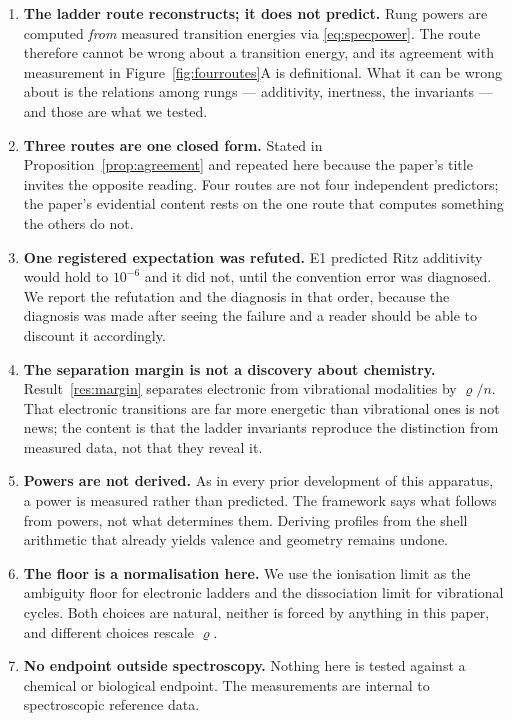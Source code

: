 \documentclass[11pt,a4paper]{article}
\theoremstyle{stmtstyle}
\theoremstyle{definition}
\theoremstyle{remark}
\newcommand{\circu}{\varrho}
\begin{document}
\begin{enumerate}[label=\textbf{L\arabic*.},leftmargin=2.9em,itemsep=4pt]

\item \textbf{The ladder route reconstructs; it does not predict.} Rung
powers are computed \emph{from} measured transition energies via
\eqref{eq:specpower}. The route therefore cannot be wrong about a
transition energy, and its agreement with measurement in
Figure~\ref{fig:fourroutes}A is definitional. What it can be wrong about is
the relations among rungs --- additivity, inertness, the invariants --- and
those are what we tested.

\item \textbf{Three routes are one closed form.} Stated in
Proposition~\ref{prop:agreement} and repeated here because the paper's
title invites the opposite reading. Four routes are not four independent
predictors; the paper's evidential content rests on the one route that
computes something the others do not.

\item \textbf{One registered expectation was refuted.} E1 predicted Ritz
additivity would hold to $10^{-6}$ and it did not, until the convention
error was diagnosed. We report the refutation and the diagnosis in that
order, because the diagnosis was made after seeing the failure and a reader
should be able to discount it accordingly.

\item \textbf{The separation margin is not a discovery about chemistry.}
Result~\ref{res:margin} separates electronic from vibrational modalities by
$\circu/n$. That electronic transitions are far more energetic than
vibrational ones is not news; the content is that the ladder invariants
reproduce the distinction from measured data, not that they reveal it.

\item \textbf{Powers are not derived.} As in every prior development of
this apparatus, a power is measured rather than predicted. The framework
says what follows from powers, not what determines them. Deriving profiles
from the shell arithmetic that already yields valence and geometry remains
undone.

\item \textbf{The floor is a normalisation here.} We use the ionisation
limit as the ambiguity floor for electronic ladders and the dissociation
limit for vibrational cycles. Both choices are natural, neither is forced by
anything in this paper, and different choices rescale $\circu$.

\item \textbf{No endpoint outside spectroscopy.} Nothing here is tested
against a chemical or biological endpoint. The measurements are internal to
spectroscopic reference data.
\end{enumerate}
\end{document}
